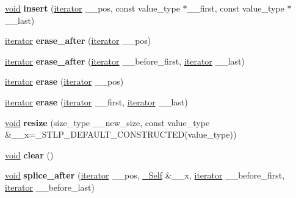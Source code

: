 \begin{DoxyCompactItemize}
\item 
\mbox{\label{classslist_a33c00375362b8076a18f877c871bbc5f}} 
\hyperlink{interfacevoid}{void} {\bfseries insert} (\hyperlink{structiterator}{iterator} \+\_\+\+\_\+pos, const value\+\_\+type $\ast$\+\_\+\+\_\+first, const value\+\_\+type $\ast$\+\_\+\+\_\+last)
\item 
\mbox{\label{classslist_a935cbe6dae711ad6f9842686f8ea7258}} 
\hyperlink{structiterator}{iterator} {\bfseries erase\+\_\+after} (\hyperlink{structiterator}{iterator} \+\_\+\+\_\+pos)
\item 
\mbox{\label{classslist_a0f5c4ce0e472bd4687837b7693ce4127}} 
\hyperlink{structiterator}{iterator} {\bfseries erase\+\_\+after} (\hyperlink{structiterator}{iterator} \+\_\+\+\_\+before\+\_\+first, \hyperlink{structiterator}{iterator} \+\_\+\+\_\+last)
\item 
\mbox{\label{classslist_a35dbce9c988530781c80307368e317ae}} 
\hyperlink{structiterator}{iterator} {\bfseries erase} (\hyperlink{structiterator}{iterator} \+\_\+\+\_\+pos)
\item 
\mbox{\label{classslist_a4dd3ecbe29ec0a3e84a75d08718aca4b}} 
\hyperlink{structiterator}{iterator} {\bfseries erase} (\hyperlink{structiterator}{iterator} \+\_\+\+\_\+first, \hyperlink{structiterator}{iterator} \+\_\+\+\_\+last)
\item 
\mbox{\label{classslist_aa12a6625994fd525d26a4be722737c40}} 
\hyperlink{interfacevoid}{void} {\bfseries resize} (size\+\_\+type \+\_\+\+\_\+new\+\_\+size, const value\+\_\+type \&\+\_\+\+\_\+x=\+\_\+\+S\+T\+L\+P\+\_\+\+D\+E\+F\+A\+U\+L\+T\+\_\+\+C\+O\+N\+S\+T\+R\+U\+C\+T\+ED(value\+\_\+type))
\item 
\mbox{\label{classslist_a4cab9db69ad3099ef5756eff0df92b6b}} 
\hyperlink{interfacevoid}{void} {\bfseries clear} ()
\item 
\mbox{\label{classslist_a43fff629ab49046d05b0460180c58dd8}} 
\hyperlink{interfacevoid}{void} {\bfseries splice\+\_\+after} (\hyperlink{structiterator}{iterator} \+\_\+\+\_\+pos, \hyperlink{classslist}{\+\_\+\+Self} \&\+\_\+\+\_\+x, \hyperlink{structiterator}{iterator} \+\_\+\+\_\+before\+\_\+first, \hyperlink{structiterator}{iterator} \+\_\+\+\_\+before\+\_\+last)

\end{DoxyCompactItemize}
